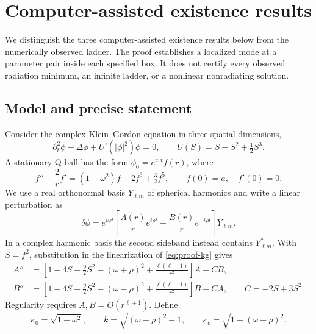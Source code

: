 \section{Computer-assisted existence results}
\label{sec:certified-existence}

We distinguish the three computer-assisted existence results below from
the numerically observed ladder. The proof establishes a localized mode
at a parameter pair inside each specified box. It does not certify every
observed radiation minimum, an infinite ladder, or a nonlinear
nonradiating solution.

\subsection{Model and precise statement}
\label{sec:proof-model}
Consider the complex Klein--Gordon equation in three spatial dimensions,
\begin{equation}
 \partial_t^2\phi-\Delta\phi+U'(|\phi|^2)\phi=0,
 \qquad U(S)=S-S^2+\tfrac12 S^3.
 \label{eq:proof-kg}
\end{equation}
A stationary Q-ball has the form $\phi_0=e^{i\omega t}f(r)$, where
\begin{equation}
 f''+\frac{2}{r}f'=(1-\omega^2)f-2f^3+\tfrac32 f^5,
 \qquad f(0)=a,\quad f'(0)=0.
 \label{eq:proof-profile}
\end{equation}
We use a real orthonormal basis $Y_{\ell m}$ of spherical harmonics and
write a linear perturbation as
\begin{equation}
 \delta\phi=e^{i\omega t}
 \left[\frac{A(r)}{r}e^{i\rho t}
       +\frac{B(r)}{r}e^{-i\rho t}\right]Y_{\ell m}.
 \label{eq:proof-mode}
\end{equation}
In a complex harmonic basis the second sideband instead contains
$Y_{\ell m}^*$. With $S=f^2$, substitution in the linearization of
\eqref{eq:proof-kg} gives
\begin{equation}
 \begin{aligned}
 A''&=\left[1-4S+\tfrac92 S^2-(\omega+\rho)^2
                  +\frac{\ell(\ell+1)}{r^2}\right]A+CB,\\
 B''&=\left[1-4S+\tfrac92 S^2-(\omega-\rho)^2
                  +\frac{\ell(\ell+1)}{r^2}\right]B+CA,
 \qquad C=-2S+3S^2.
 \end{aligned}
 \label{eq:proof-radial-system}
\end{equation}
Regularity requires $A,B=O(r^{\ell+1})$. Define
\begin{equation}
 \kappa_0=\sqrt{1-\omega^2},\qquad
 k=\sqrt{(\omega+\rho)^2-1},\qquad
 \kappa_c=\sqrt{1-(\omega-\rho)^2}.
 \label{eq:proof-channel-numbers}
\end{equation}

